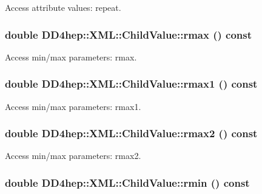 Access attribute values: repeat. \hypertarget{struct_d_d4hep_1_1_x_m_l_1_1_child_value_a94ef57d56ce57a66bf482c77d5d7e2dc}{
\subsubsection[{rmax}]{\setlength{\rightskip}{0pt plus 5cm}double DD4hep::XML::ChildValue::rmax () const}}
\label{struct_d_d4hep_1_1_x_m_l_1_1_child_value_a94ef57d56ce57a66bf482c77d5d7e2dc}


Access min/max parameters: rmax. \hypertarget{struct_d_d4hep_1_1_x_m_l_1_1_child_value_a69bfb0ab03a3dfc239d35d19e43bb073}{
\subsubsection[{rmax1}]{\setlength{\rightskip}{0pt plus 5cm}double DD4hep::XML::ChildValue::rmax1 () const}}
\label{struct_d_d4hep_1_1_x_m_l_1_1_child_value_a69bfb0ab03a3dfc239d35d19e43bb073}


Access min/max parameters: rmax1. \hypertarget{struct_d_d4hep_1_1_x_m_l_1_1_child_value_a26352df69d8839203a6343f567e3f16a}{
\subsubsection[{rmax2}]{\setlength{\rightskip}{0pt plus 5cm}double DD4hep::XML::ChildValue::rmax2 () const}}
\label{struct_d_d4hep_1_1_x_m_l_1_1_child_value_a26352df69d8839203a6343f567e3f16a}


Access min/max parameters: rmax2. \hypertarget{struct_d_d4hep_1_1_x_m_l_1_1_child_value_a5838118c21da60268fcb9c8ade70e532}{
\subsubsection[{rmin}]{\setlength{\rightskip}{0pt plus 5cm}double DD4hep::XML::ChildValue::rmin () const}}
\label{struct_d_d4hep_1_1_x_m_l_1_1_child_value_a5838118c21da60268fcb9c8ade70e532}


